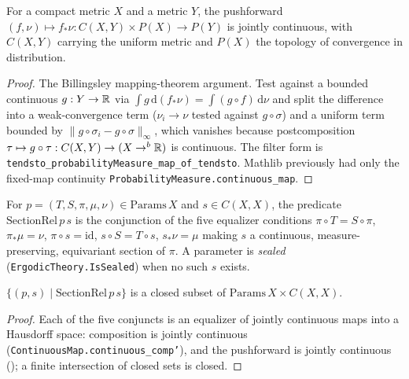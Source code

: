 \begin{theorem}\label{thm:dst-pushforward-cont}
  \leanok
  For a compact metric \(X\) and a metric \(Y\), the pushforward
  \((f,\nu) \mapsto f_*\nu : C(X,Y) \times P(X) \to P(Y)\) is jointly continuous, with
  \(C(X,Y)\) carrying the uniform metric and \(P(X)\) the topology of convergence in distribution.
\end{theorem}
\begin{proof}\leanok
  The Billingsley mapping-theorem argument. Test against a bounded continuous \(g : Y \to \mathbb{R}\) via
  \(\int g\,\mathrm d(f_*\nu) = \int (g\circ f)\,\mathrm d\nu\) and split the difference into a
  weak-convergence term (\(\nu_i \to \nu\) tested against \(g\circ\sigma\)) and a uniform term bounded
  by \(\|g\circ\sigma_i - g\circ\sigma\|_\infty\), which vanishes because postcomposition
  \(\tau \mapsto g\circ\tau : C(X,Y) \to (X \to^b \mathbb{R})\) is continuous. The filter form is
  \texttt{tendsto\_probabilityMeasure\_map\_of\_tendsto}. Mathlib previously had only the fixed-map
  continuity \texttt{ProbabilityMeasure.continuous\_map}.
\end{proof}

\begin{definition}\label{thm:dst-sectionrel}
  \leanok
  For \(p = (T,S,\pi,\mu,\nu) \in \mathrm{Params}\,X\) and \(s \in C(X,X)\), the predicate
  \(\mathrm{SectionRel}\,p\,s\) is the conjunction of the five equalizer conditions
  \(\pi\circ T = S\circ\pi\), \(\pi_*\mu = \nu\), \(\pi\circ s = \mathrm{id}\), \(s\circ S = T\circ
  s\), \(s_*\nu = \mu\) making \(s\) a continuous, measure-preserving, equivariant section of \(\pi\).
  A parameter is \emph{sealed} (\texttt{ErgodicTheory.IsSealed}) when no such \(s\) exists.
\end{definition}

\begin{theorem}\label{thm:dst-sectionrel-closed}
  \leanok
  \(\{(p,s) \mid \mathrm{SectionRel}\,p\,s\}\) is a closed subset of
  \(\mathrm{Params}\,X \times C(X,X)\).
\end{theorem}
\begin{proof}\leanok
  Each of the five conjuncts is an equalizer of jointly continuous maps into a Hausdorff space:
  composition is jointly continuous (\texttt{ContinuousMap.continuous\_comp'}), and the pushforward
  is jointly continuous (); a finite intersection of closed sets is
  closed.
\end{proof}

